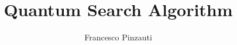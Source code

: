 \begin{titlepage}
\title{Quantum Search Algorithm}
\author{Francesco Pinzauti}
\date{}
\maketitle
\end{titlepage}